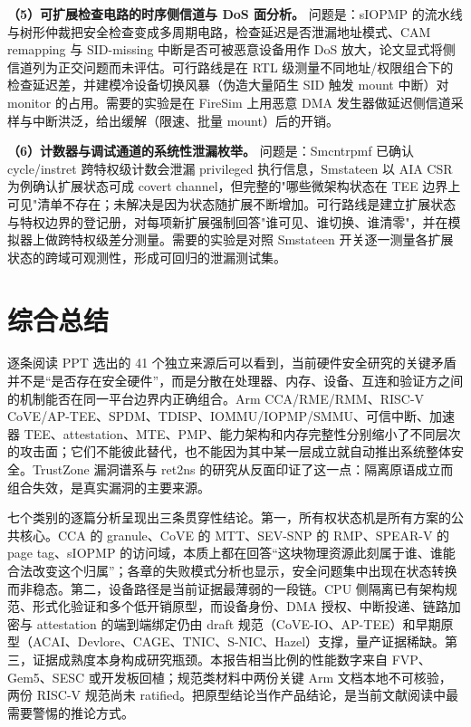 \documentclass[11pt]{ctexart}
\begin{document}
\noindent\textbf{（5）可扩展检查电路的时序侧信道与 DoS 面分析。} 问题是：sIOPMP 的流水线与树形仲裁把安全检查变成多周期电路，检查延迟是否泄漏地址模式、CAM remapping 与 SID-missing 中断是否可被恶意设备用作 DoS 放大，论文显式将侧信道列为正交问题而未评估\cite{feng2024siopmp}。可行路线是在 RTL 级测量不同地址/权限组合下的检查延迟差，并建模冷设备切换风暴（伪造大量陌生 SID 触发 mount 中断）对 monitor 的占用。需要的实验是在 FireSim 上用恶意 DMA 发生器做延迟侧信道采样与中断洪泛，给出缓解（限速、批量 mount）后的开销。\par
\noindent\textbf{（6）计数器与调试通道的系统性泄漏枚举。} 问题是：Smcntrpmf 已确认 cycle/instret 跨特权级计数会泄漏 privileged 执行信息，Smstateen 以 AIA CSR 为例确认扩展状态可成 covert channel\cite{riscv_privileged}，但完整的"哪些微架构状态在 TEE 边界上可见"清单不存在；未解决是因为状态随扩展不断增加。可行路线是建立扩展状态与特权边界的登记册，对每项新扩展强制回答"谁可见、谁切换、谁清零"，并在模拟器上做跨特权级差分测量。需要的实验是对照 Smstateen 开关逐一测量各扩展状态的跨域可观测性，形成可回归的泄漏测试集。\par
\section{综合总结}

逐条阅读 PPT 选出的 41 个独立来源后可以看到，当前硬件安全研究的关键矛盾并不是“是否存在安全硬件”，而是分散在处理器、内存、设备、互连和验证方之间的机制能否在同一平台边界内正确组合。Arm CCA/RME/RMM、RISC-V CoVE/AP-TEE、SPDM、TDISP、IOMMU/IOPMP/SMMU、可信中断、加速器 TEE、attestation、MTE、PMP、能力架构和内存完整性分别缩小了不同层次的攻击面；它们不能彼此替代，也不能因为其中某一层成立就自动推出系统整体安全。TrustZone 漏洞谱系与 ret2ns 的研究从反面印证了这一点：隔离原语成立而组合失效，是真实漏洞的主要来源。

七个类别的逐篇分析呈现出三条贯穿性结论。第一，所有权状态机是所有方案的公共核心。CCA 的 granule、CoVE 的 MTT、SEV-SNP 的 RMP、SPEAR-V 的 page tag、sIOPMP 的访问域，本质上都在回答“这块物理资源此刻属于谁、谁能合法改变这个归属”；各章的失败模式分析也显示，安全问题集中出现在状态转换而非稳态。第二，设备路径是当前证据最薄弱的一段链。CPU 侧隔离已有架构规范、形式化验证和多个低开销原型，而设备身份、DMA 授权、中断投递、链路加密与 attestation 的端到端绑定仍由 draft 规范（CoVE-IO、AP-TEE）和早期原型（ACAI、Devlore、CAGE、TNIC、S-NIC、Hazel）支撑，量产证据稀缺。第三，证据成熟度本身构成研究瓶颈。本报告相当比例的性能数字来自 FVP、Gem5、SESC 或开发板回植；规范类材料中两份关键 Arm 文档本地不可核验，两份 RISC-V 规范尚未 ratified。把原型结论当作产品结论，是当前文献阅读中最需要警惕的推论方式。
\end{document}
